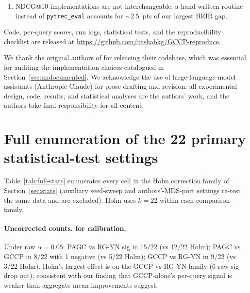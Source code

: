 \documentclass[sigconf]{acmart}
\begin{document}
\begin{enumerate}[leftmargin=1.5em,nosep]
{          NDCG@10 $=0.7465$ on DL19,} surpassing our reproduced
          Flan-UL2 ($0.7095$) and both paper Flan-UL2 variants
          ($0.7206$ RG-YN+GCCP, $0.7200$ PAGC-QSG). A 50-query
          BEIR check shows the DBPedia negative \emph{strengthens}
          under this 72B backbone: PAGC ($0.4139$) underperforms
          not just GCCP-alone ($0.4380$) but also the E5
          first-stage ($0.4168$). At 7--8B, Qwen-2.5-7B is
          competitive with Flan-T5-XL ($p{=}0.125$); LLaMA-3.1-8B
          is below Flan-T5-Large; Mistral-7B underperforms.
          Backbone family matters at least as much as parameter
          count at 7--8B; quantization is not a barrier at 72B.
    \item NDCG@10 implementations are not interchangeable; a
          hand-written routine instead of \texttt{pytrec\_eval}
          accounts for $\sim 2.5$~pts of our largest BEIR gap.
\end{enumerate}

Code, per-query scores, run logs, statistical tests, and the
reproducibility checklist are released at
\url{https://github.com/utshabkg/GCCP-reproduce}.

\begin{acks}
We thank the original authors of \cite{long2025precise} for
releasing their codebase, which was essential for auditing the
implementation choices catalogued in
Section~\ref{sec:undocumented}.
We acknowledge the use of large-language-model assistants
(Anthropic Claude) for prose drafting and revision; all
experimental design, code, results, and statistical analyses
are the authors' work, and the authors take final responsibility
for all content.
\end{acks}

\appendix

\section{Full enumeration of the 22 primary statistical-test settings}
\label{app:full-stats}

Table~\ref{tab:full-stats} enumerates every cell in the Holm
correction family of Section~\ref{sec:stats} (auxiliary
seed-sweep and authors'-MDS-port settings re-test the same data and are
excluded). Holm uses $k=22$ within each comparison family.

\paragraph{Uncorrected counts, for calibration.}
Under raw $\alpha{=}0.05$: PAGC vs RG-YN sig in 15/22 (vs 12/22
Holm); PAGC vs GCCP in 8/22 with 1 negative (vs 5/22 Holm);
GCCP vs RG-YN in 9/22 (vs 3/22 Holm). Holm's largest effect is on
the GCCP-vs-RG-YN family (6 raw-sig drop out), consistent with
our finding that GCCP-alone's per-query signal is weaker than
aggregate-mean improvements suggest.
\end{document}
